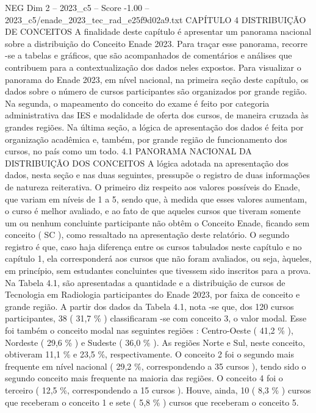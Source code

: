 \begin{textsample}{NEG Dim 2 – 2023\_c5 – Score -1.00 – 2023\_c5/enade\_2023\_tec\_rad\_e25f9d02a9.txt}  \label{ex:f2_neg_173}
CAPÍTULO 4 DISTRIBUIÇÃO DE CONCEITOS A finalidade deste capítulo é apresentar um panorama nacional sobre a distribuição do Conceito Enade 2023.
Para traçar esse panorama, recorre -se a tabelas e gráficos, que são acompanhados de comentários e análises que contribuem para a contextualização dos dados neles expostos.
Para visualizar o panorama do Enade 2023, em nível nacional, na primeira seção deste capítulo, os dados sobre o número de cursos participantes são organizados por grande região.
Na segunda, o mapeamento do conceito do exame é feito por categoria administrativa das IES e modalidade de oferta dos cursos, de maneira cruzada às grandes regiões.
Na última seção, a lógica de apresentação dos dados é feita por organização acadêmica e, também, por grande região de funcionamento dos cursos, no país como um todo. 4.1 PANORAMA NACIONAL DA DISTRIBUIÇÃO DOS CONCEITOS A lógica adotada na apresentação dos dados, nesta seção e nas duas seguintes, pressupõe o registro de duas informações de natureza reiterativa.
O primeiro diz respeito aos valores possíveis do Enade, que variam em níveis de 1 a 5, sendo que, à medida que esses valores aumentam, o curso é melhor avaliado, e ao fato de que aqueles cursos que tiveram somente um ou nenhum concluinte participante não obtêm o Conceito Enade, ficando sem conceito ( SC ), como ressaltado na apresentação deste relatório.
O segundo registro é que, caso haja diferença entre os cursos tabulados neste capítulo e no capítulo 1, ela corresponderá aos cursos que não foram avaliados, ou seja, àqueles, em princípio, sem estudantes concluintes que tivessem sido inscritos para a prova.
Na Tabela 4.1, são apresentadas a quantidade e a distribuição de cursos de Tecnologia em Radiologia participantes do Enade 2023, por faixa de conceito e grande região.
A partir dos dados da Tabela 4.1, nota -se que, dos 120 cursos participantes, 38 ( 31,7 \% ) classificaram -se com conceito 3, o valor modal.
Esse foi também o conceito modal nas seguintes regiões : Centro-Oeste ( 41,2 \% ), Nordeste ( 29,6 \% ) e Sudeste ( 36,0 \% ).
As regiões Norte e Sul, neste conceito, obtiveram 11,1 \% e 23,5 \%, respectivamente.
O conceito 2 foi o segundo mais frequente em nível nacional ( 29,2 \%, correspondendo a 35 cursos ), tendo sido o segundo conceito mais frequente na maioria das regiões.
O conceito 4 foi o terceiro ( 12,5 \%, correspondendo a 15 cursos ).
Houve, ainda, 10 ( 8,3 \% ) cursos que receberam o conceito 1 e sete ( 5,8 \% ) cursos que receberam o conceito 5.

\end{textsample}
